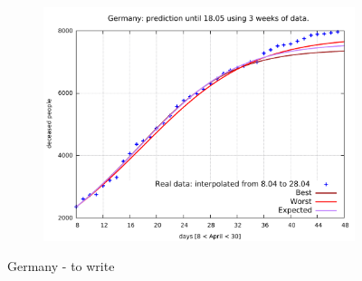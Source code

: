 \documentclass[8pt]{article}
\begin{document}
\begin{figure}[h!]
\begin{subfigure}[b]{0.45\linewidth}
  \includegraphics[width=\linewidth]{../simulations/de/8-28/8-28.pdf}
  \end{subfigure}
	\caption{Germany - to write}
\end{figure}
\end{document}
